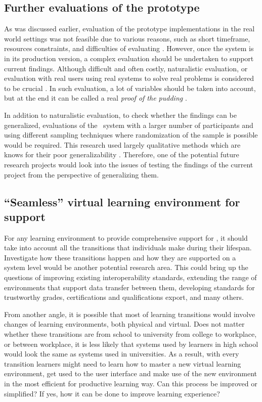 \subsection{Further evaluations of the prototype}
As was discussed earlier, evaluation of the prototype implementations in the
real world settings was not feasible due to various reasons, such as short
timeframe, resources constraints, and difficulties of evaluating \LLLsn.
However, once the system is in its production version, a complex evaluation
should be undertaken to support current findings. Although difficult and often
costly, naturalistic evaluation, or evaluation with real users using real
systems to solve real problems is considered to be crucial
\citep{Pries-Heje2008}. In such evaluation, a lot of variables should be taken
into account, but at the end it can be called a real \textit{proof of the
pudding} \citep{Venable2010}.

In addition to naturalistic evaluation, to check whether the findings can be
generalized, evaluations of the \ep~system with a larger number of participants
and using different sampling techniques where randomization of the sample is
possible would be required. This research used largely qualitative methods which
are knows for their poor generalizability \citep{Trochim2001}. Therefore, one of
the potential future research projects would look into the issues of testing the
findings of the current project from the perspective of generalizing them.

\subsection[``Seamless'' environment for \LLLs support]{``Seamless'' virtual
learning environment for \LLLs support} 
For any learning environment to provide comprehensive support for \LLLs, it
should take into account all the transitions that individuals make during their
lifespan. Investigate how these transitions happen and how they are supported on
a system level would be another potential research area. This could bring up the
questions of improving existing interoperability standards, extending the range
of environments that support data transfer between them, developing standards
for trustworthy grades, certifications and qualifications export, and many
others.

From another angle, it is possible that most of learning transitions would
involve changes of learning environments, both physical and virtual. Does not
matter whether these transitions are from school to university from college to
workplace, or between workplace, it is less likely that systems used by learners
in high school would look the same as systems used in universities. As a result,
with every transition learners might need to learn how to master a new virtual
learning environment, get used to the user interface and make use of the new
environment in the most efficient for productive learning way. Can this process
be improved or simplified? If yes, how it can be done to improve learning
experience?

